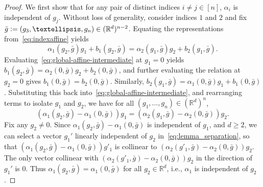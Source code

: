 \documentclass[10pt,a4paper]{amsart}
\newcommand{\R}{\mathbb{R}}
\begin{document}
\begin{proof}
    We first show that for any pair of distinct indices $i \neq j \in [n]$, $\alpha_i$ is independent of $g_j$. 
    Without loss of generality, consider indices $1$ and $2$ and fix $\bar{g} \vcentcolon= (g_3, \ldots, g_n) \in (\R^d)^{n-2}$. 
    Equating the representations from~\eqref{eq:indexaffine} yields
    \begin{equation}\label{eq:global-affine-intermediate}
        \alpha_1(g_2, \bar{g}) g_1 + b_1(g_2, \bar{g}) = \alpha_2(g_1, \bar{g}) g_2 + b_2(g_1, \bar{g}).
    \end{equation}
    Evaluating~\eqref{eq:global-affine-intermediate} at $g_1=0$ yields $b_1(g_2, \bar{g}) = \alpha_2(0, \bar{g}) g_2 + b_2(0, \bar{g})$, and further evaluating the relation at $g_2=0$ gives $b_1(0, \bar{g}) = b_2(0, \bar{g})$. 
    Similarly, $b_2(g_1, \bar{g}) = \alpha_1(0, \bar{g}) g_1 + b_1(0, \bar{g})$.
    Substituting this back into~\eqref{eq:global-affine-intermediate}, and rearranging terms to isolate $g_1$ and $g_2$, we have for all $(g_1, \ldots, g_n) \in (\R^d)^n$,
    \begin{equation}\label{eq:lemma_separation}
        (\alpha_1(g_2, \bar{g}) - \alpha_1(0, \bar{g})) g_1 = (\alpha_2(g_1, \bar{g}) - \alpha_2(0, \bar{g})) g_2.
    \end{equation}
    Fix any $g_2 \neq 0$.
    Since $\alpha_1(g_2, \bar{g}) - \alpha_1(0, \bar{g})$ is independent of $g_1$, and $d \geq 2$, we can select a vector $g_1'$ linearly independent of $g_2$ in~\eqref{eq:lemma_separation}, so that $(\alpha_1(g_2, \bar{g}) - \alpha_1(0, \bar{g})) g'_1$ is collinear to $(\alpha_2(g'_1, \bar{g}) - \alpha_2(0, \bar{g})) g_2$. 
    The only vector collinear with $(\alpha_2(g'_1, \bar{g}) - \alpha_2(0, \bar{g})) g_2$ in the direction of $g_1'$ is $0$.
    Thus $\alpha_1(g_2, \bar{g}) = \alpha_1(0, \bar{g})$ for all $g_2\in\R^d$, i.e., $\alpha_1$ is independent of $g_2$. 


\end{proof}
\end{document}

